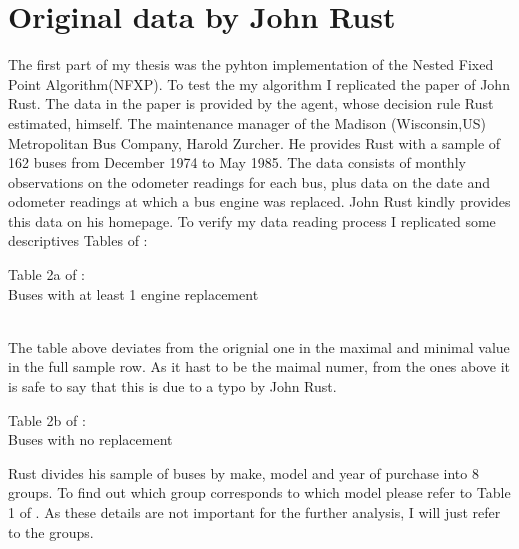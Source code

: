 \documentclass[a4paper,12pt,bold]{scrartcl}
\begin{document}
\section{Original data by John Rust}
The first part of my thesis was the pyhton implementation of the Nested Fixed Point Algorithm(NFXP). To test the my algorithm I replicated the paper of John Rust. The data in the paper is provided by the agent, whose decision rule Rust estimated, himself. The maintenance manager of the Madison (Wisconsin,US) Metropolitan Bus Company, Harold Zurcher. He provides Rust with a sample of 162 buses from December 1974 to May 1985. The data consists of monthly observations on the odometer readings for each bus, plus data on the date and odometer readings at which a bus engine was replaced. John Rust kindly provides this data on his homepage. To verify my data reading process I replicated some descriptives Tables of \cite{Rust.1987}:\\
\begin{table}[h]
\begin{center}
  
  \caption{Table 2a of \cite{Rust.1987}: \\ Buses with at least 1 engine replacement}
\end{center}
\end{table} \\
The table above deviates from the orignial one in the maximal and minimal value in the full sample row. As it hast to be the maimal numer, from the ones above it is safe to say that this is due to a typo by John Rust. \\
\begin{table}[h]
\begin{center}
  
  \caption{Table 2b of \cite{Rust.1987}: \\ Buses with no replacement}
\end{center}
\end{table}
Rust divides his sample of buses by make, model and year of purchase into 8 groups. To find out which group corresponds to which model please refer to Table 1 of \cite{Rust.1987}. As these details are not important for the further analysis, I will just refer to the groups.
\newpage
\end{document}
